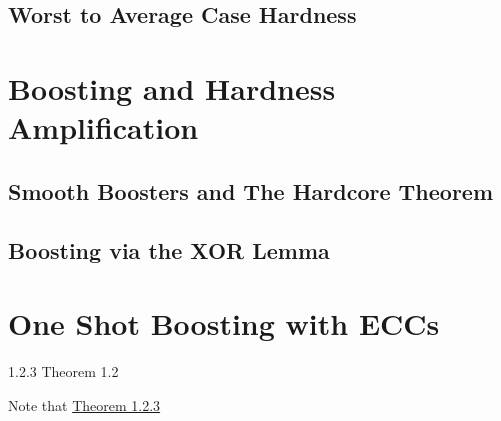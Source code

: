 \documentclass{article}
\begin{document}
\subsection{Worst to Average Case Hardness}

\section{Boosting and Hardness Amplification}

\subsection{Smooth Boosters and The Hardcore Theorem}

\subsection{Boosting via the XOR Lemma}

\section{One Shot Boosting with ECCs}

\begin{theorem}{1.2.3}\label{t-1.2.3}
    Theorem 1.2
\end{theorem}
    
\begin{claim}{1.2}

\end{claim}

\begin{observation}{1.5}
\end{observation}

\begin{lemma}{1.5}
\end{lemma}

\begin{definition}{1.5}
\end{definition}

Note that \hyperref[t-1.2.3]{Theorem 1.2.3}
\end{document}
